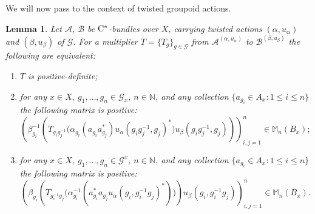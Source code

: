 \documentclass[11 pt, leqno]{amsart}
\numberwithin{equation}{section}
\theoremstyle{plain}
\newtheorem {lem} [thm]{Lemma}
\theoremstyle{definition}
\newcommand{\Mat}{\mathbb M} %
\newcommand{\B}{\mathcal B}
\newcommand{\m}{m}
\newcommand{\G}{\mathcal G} %
\newcommand{\A}{\mathcal A}
\newcommand{\N}{\mathbb N}
\newcommand{\cst}{\ifmmode\mathrm{C}^*\else{$\mathrm{C}^*$}\fi}
\begin{document}

We will now pass to the context of twisted groupoid actions.

\begin{lem}\label{lem:positive_action}
Let $\A$, $\B$ be $\cst$-bundles over $X$, carrying twisted actions $(\alpha,u_\alpha)$ and $(\beta,u_\beta)$ of $\G$.
For a  multiplier $T=\{T_g\}_{g\in \G}$ from $\A^{(\alpha,u_{\alpha})}$ to $\B^{(\beta,u_{\beta})}$ the following are equivalent:
\begin{enumerate}
    \item\label{enu:positive_action1} $T$ is positive-definite;
    \item\label{enu:positive_action2} for any $x \in X$, $g_1 , \ldots , g_n \in \G_x$, $n \in \N$, and any collection $\{ a_{g_i} \in A_x : 1 \leq i \leq n \}$ the following matrix is positive: 
	\[
	   \left( \beta_{g_i}^{-1} \left(T_{g_i g_j^{-1}} \big( \alpha_{g_i}(a_{g_i} a_{g_j}^*) u_{\alpha}(g_i g_j^{-1} , g_j)^* \big) u_{\beta}(g_i g_j^{-1} , g_j) \right) \right)_{i,j = 1}^n \in \Mat_{n}(B_x);
	\]
	\item\label{enu:positive_action3} for any $x \in X$, $g_1 , \ldots , g_n \in \G^x$, $n \in \N$, and any collection $\{ a_{g_i} \in A_x : 1 \leq i \leq n \}$ the following matrix is positive: 
	\[
	   \left( \beta_{g_i} \left(T_{g_i^{-1} g_j} \big( \alpha_{g_i}^{-1}(a_{g_i}^* a_{g_j} u_{\alpha}(g_i , g_i^{-1} g_j)^*) \big) \right) u_{\beta}(g_i , g_i^{-1} g_j) \right)_{i,j = 1}^n \in \Mat_{n}(B_x). 
	\]
	\end{enumerate}
\end{lem}
\end{document}
